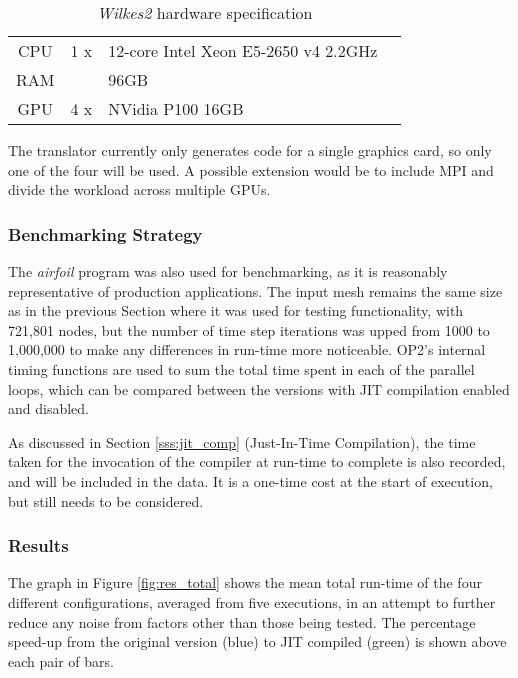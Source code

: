 \begin{table}[h]
  \centering
  \renewcommand{\arraystretch}{1.5}
  \caption{\textit{Wilkes2} hardware specification}
  \label{tab:wilkes2}
\begin{tabular}{c |r l c}
CPU & 1 x&12-core Intel Xeon E5-2650 v4 2.2GHz & \cite{xeon}\\
RAM & &96GB &\\
GPU & 4 x&NVidia P100 16GB &\cite{p100}\\
\end{tabular}
\end{table}

\noindent The translator currently only generates code for a single graphics card, so only one of the four will be used. A possible extension would be to include MPI and divide the workload across multiple GPUs.

\subsubsection{Benchmarking Strategy}
The \textit{airfoil} program was also used for benchmarking, as it is reasonably representative of production applications. The input mesh remains the same size as in the previous Section where it was used for testing functionality, with 721,801 nodes, but the number of time step iterations was upped from 1000 to 1,000,000 to make any differences in run-time more noticeable. OP2's internal timing functions are used to sum the total time spent in each of the parallel loops, which can be compared between the versions with JIT compilation enabled and disabled.
\par
As discussed in Section \ref{sss:jit_comp} (Just-In-Time Compilation), the time taken for the invocation of the compiler at run-time to complete is also recorded, and will be included in the data. It is a one-time cost at the start of execution, but still needs to be considered.
\clearpage
\subsubsection{Results}
The graph in Figure \ref{fig:res_total} shows the mean total run-time of the four different configurations, averaged from five executions, in an attempt to further reduce any noise from factors other than those being tested. The percentage speed-up from the original version (blue) to JIT compiled (green) is shown above each pair of bars.

